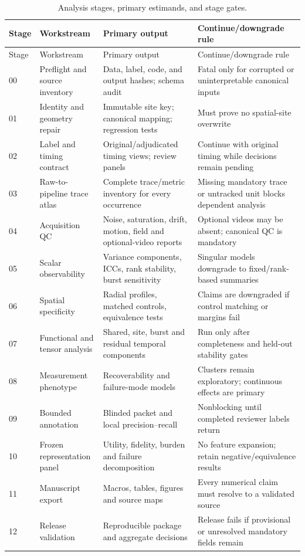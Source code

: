 \begingroup
\footnotesize
\setlength{\tabcolsep}{3pt}
\begin{longtable}{p{} p{} p{} p{}}
\caption{Analysis stages, primary estimands, and stage gates.}\label{tab:analysis-plan}\\
\toprule
Stage & Workstream & Primary output & Continue/downgrade rule \\
\midrule
\endfirsthead
\toprule
Stage & Workstream & Primary output & Continue/downgrade rule \\
\midrule
\endhead
00 & Preflight and source inventory & Data, label, code, and output hashes; schema audit & Fatal only for corrupted or uninterpretable canonical inputs \\
01 & Identity and geometry repair & Immutable site key; canonical mapping; regression tests & Must prove no spatial-site overwrite \\
02 & Label and timing contract & Original/adjudicated timing views; review panels & Continue with original timing while decisions remain pending \\
03 & Raw-to-pipeline trace atlas & Complete trace/metric inventory for every occurrence & Missing mandatory trace or untracked unit blocks dependent analysis \\
04 & Acquisition QC & Noise, saturation, drift, motion, field and optional-video reports & Optional videos may be absent; canonical QC is mandatory \\
05 & Scalar observability & Variance components, ICCs, rank stability, burst sensitivity & Singular models downgrade to fixed/rank-based summaries \\
06 & Spatial specificity & Radial profiles, matched controls, equivalence tests & Claims are downgraded if control matching or margins fail \\
07 & Functional and tensor analysis & Shared, site, burst and residual temporal components & Run only after completeness and held-out stability gates \\
08 & Measurement phenotype & Recoverability and failure-mode models & Clusters remain exploratory; continuous effects are primary \\
09 & Bounded annotation & Blinded packet and local precision--recall & Nonblocking until completed reviewer labels return \\
10 & Frozen representation panel & Utility, fidelity, burden and failure decomposition & No feature expansion; retain negative/equivalence results \\
11 & Manuscript export & Macros, tables, figures and source maps & Every numerical claim must resolve to a validated source \\
12 & Release validation & Reproducible package and aggregate decisions & Release fails if provisional or unresolved mandatory fields remain \\
\bottomrule
\end{longtable}
\endgroup
